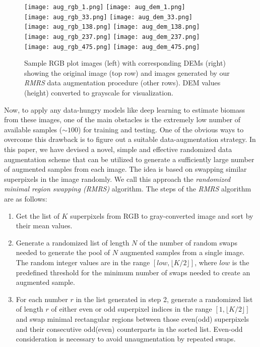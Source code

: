 \documentclass[10pt,twocolumn,letterpaper]{article}
\newcommand{\floor}[1]{\lfloor #1 \rfloor}
\begin{document}
\begin{figure}[t]
	\centering
	\texttt{[image: aug\_rgb\_1.png]}
	\texttt{[image: aug\_dem\_1.png]} \\
	\texttt{[image: aug\_rgb\_33.png]}
	\texttt{[image: aug\_dem\_33.png]} \\
	\texttt{[image: aug\_rgb\_138.png]}
	\texttt{[image: aug\_dem\_138.png]} \\
	\texttt{[image: aug\_rgb\_237.png]}
	\texttt{[image: aug\_dem\_237.png]} \\
	\texttt{[image: aug\_rgb\_475.png]}
	\texttt{[image: aug\_dem\_475.png]}
    \caption{Sample RGB plot images (left) with corresponding DEMs (right) showing the original image (top row) and images generated by our \emph{RMRS} data augmentation procedure (other rows). DEM values (height) converted to grayscale for visualization.}
    \label{fig:sample_augment}
\end{figure}

Now, to apply any data-hungry models like deep learning to estimate biomass from these images, one of the main obstacles is the extremely low number of available samples ($\sim100$) for training and testing. One of the obvious ways to overcome this drawback is to figure out a suitable data-augmentation strategy. In this paper, we have devised a novel, simple and effective randomized data augmentation scheme that can be utilized to generate a sufficiently large number of augmented samples from each image. The idea is based on swapping similar superpixels in the image randomly. We call this approach the \textit{randomized minimal region swapping (RMRS)} algorithm. The steps of the \textit{RMRS} algorithm are as follows:

\begin{enumerate}
	\item Get the list of $K$ superpixels from RGB to gray-converted image and sort by their mean values.
	\item Generate a randomized list of length $N$ of the number of random swaps needed to generate the pool of $N$ augmented samples from a single image. The random integer values are in the range $[low, \floor{K/2}]$, where $low$ is the predefined threshold for the minimum number of swaps needed to create an augmented sample.
	\item For each number $r$ in the list generated in step 2, generate a randomized list of length $r$  of either even or odd superpixel indices in the range $[1, \floor{K/2}]$ and swap minimal rectangular regions between those even(odd) superpixels and their consecutive odd(even) counterparts in the sorted list. Even-odd consideration is necessary to avoid unaugmentation by repeated swaps.
\end{enumerate}
\end{document}
